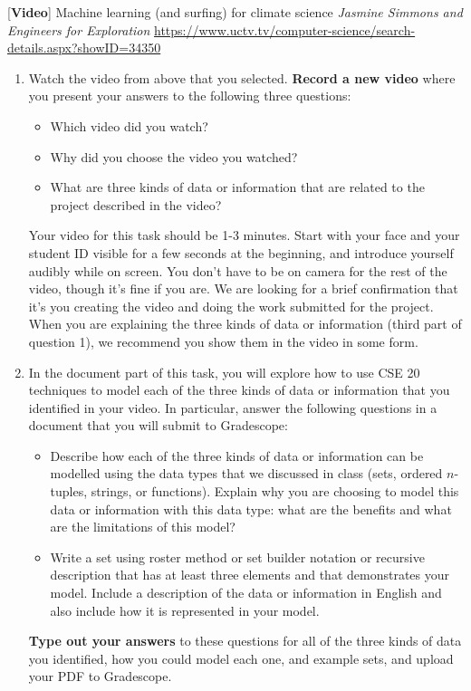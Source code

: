 [{\bf Video}] Machine learning (and surfing) for climate science {\it Jasmine Simmons and Engineers for Exploration}
{\small \url{https://www.uctv.tv/computer-science/search-details.aspx?showID=34350}}



\begin{enumerate}
\item Watch the video from above that you selected. {\bf Record a new video} where you present 
your answers to the following three questions:
\begin{itemize}
    \item Which video did you watch?
    \item Why did you choose the video you watched?
    \item What are three kinds of data or information that are related to the project described in the video?
\end{itemize}
Your video for this task should be 1-3 minutes. Start with 
your face and your student ID visible for a few seconds at the beginning, and introduce yourself audibly while on screen. 
You don't have to be on camera for the rest of the video, though it's fine if you are. 
We are looking for a brief confirmation that it's you creating the video and doing the work 
submitted for the project. When you are explaining the three kinds of data or information (third part of question 1), 
we recommend you show them in the video in some form.

\item In the document part of this task, you will explore how to use CSE 20 techniques to 
model each of the three kinds of data or 
information that you identified in 
your video. In particular, answer the following questions in a document 
that you will submit to Gradescope:
\begin{itemize}
    \item Describe how each of the three kinds of data or information 
    can be modelled using the data types that we discussed in class (sets, ordered $n$-tuples, 
    strings, or functions). Explain why you are choosing to model this data or information with this data type: what are the benefits 
    and what are the limitations of this model?
    \item Write a set using roster method or set builder notation or recursive description that has at least three elements
    and that demonstrates
    your model. Include a description of the data or information in English and also include how it is represented 
    in your model.
\end{itemize}
{\bf Type out your answers} to these questions for all of the three kinds of data you identified, 
how you could model each one, and example sets, and upload your PDF 
to Gradescope.
\end{enumerate}


